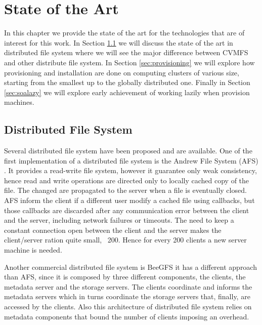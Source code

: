 \chapter{State of the Art}\label{ch:SoA}

In this chapter we provide the state of the art for the technologies that are
of interest for this work. In Section \ref{sec:distribute} we will discuss the
state of the art in distributed file system where we will see the major
difference between CVMFS and other distribute file system. In Section
\ref{sec:provisioning} we will explore how provisioning and installation are
done on computing clusters of various size, starting from the smallest up to
the globally distributed one. Finally in Section \ref{sec:soalazy} we will
explore early achievement of working lazily when provision machines.

\section{Distributed File System} \label{sec:distribute}

Several distributed file system have been proposed and are available. One of
the first implementation of a distributed file system is the Andrew File System
(AFS) \cite{andrew}. It provides a read-write file system, however it guarantee
only weak consistency, hence read and write operations are directed only to
locally cached copy of the file. The changed are propagated to the server when
a file is eventually closed. AFS inform the client if a different user modify a
cached file using callbacks, but those callbacks are discarded after any
communication error between the client and the server, including network
failures or timeouts. The need to keep a constant connection open between the
client and the server makes the client/server ration quite small, ~200. Hence
for every 200 clients a new server machine is needed.

Another commercial distributed file system is BeeGFS it has a different
approach than AFS, since it is composed by three different components, the
clients, the metadata server and the storage servers. The clients coordinate
and informs the metadata servers which in turns coordinate the storage servers
that, finally, are accessed by the clients.  Also this architecture of
distributed file system relies on metadata components that bound the number of
clients imposing an overhead.

